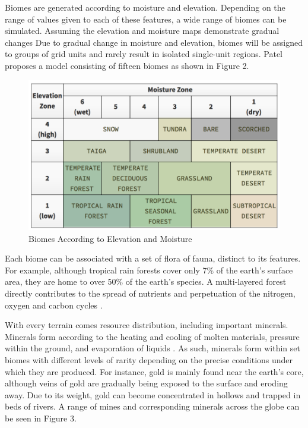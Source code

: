 Biomes are generated according to moisture and elevation. Depending on the range of values given to each of these features, a wide range of biomes can be simulated. Assuming the elevation and moisture maps demonstrate gradual changes Due to gradual change in moisture and elevation, biomes will be assigned to groups of grid units and rarely result in isolated single-unit regions. Patel proposes a model consisting of fifteen biomes as shown in Figure 2. 

\begin{figure}
\includegraphics[width=\textwidth]{Biomes.png}
\caption{Biomes According to Elevation and Moisture}
\end{figure}

Each biome can be associated with a set of flora of fauna, distinct to its features. For example, although tropical rain forests cover only 7\% of the earth's surface area, they are home to over 50\% of the earth's species. A multi-layered forest directly contributes to the spread of nutrients and perpetuation of the nitrogen, oxygen and carbon cycles \cite{Robinson:2008:Online}. 

With every terrain comes resource distribution, including important minerals. Minerals form according to the heating and cooling of molten materials, pressure within the ground, and evaporation of liquids \cite{9780939950812}. As such, minerals form within set biomes with different levels of rarity depending on the precise conditions under which they are produced. For instance, gold is mainly found near the earth's core, although veins of gold are gradually being exposed to the surface and eroding away. Due to its weight, gold can become concentrated in hollows and trapped in beds of rivers. A range of mines and corresponding minerals across the globe can be seen in Figure 3. 

